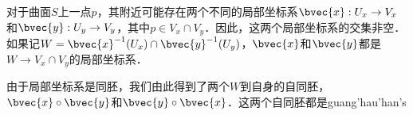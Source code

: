 
对于曲面$S$上一点$p$，其附近可能存在两个不同的局部坐标系$\bvec{x}:U_x\to V_x$和$\bvec{y}:U_y\to V_y$，其中$p\in V_x\cap V_y$．因此，这两个局部坐标系的交集非空．如果记$W=\bvec{x}^{-1}(U_x)\cap\bvec{y}^{-1}(U_y)$，$\bvec{x}$和$\bvec{y}$都是$W\to V_x\cap V_y$的局部坐标系．

由于局部坐标系是同胚，我们由此得到了两个$W$到自身的自同胚，$\bvec{x}\circ\bvec{y}$和$\bvec{y}\circ\bvec{x}$．这两个自同胚都是guang'hau'han's







